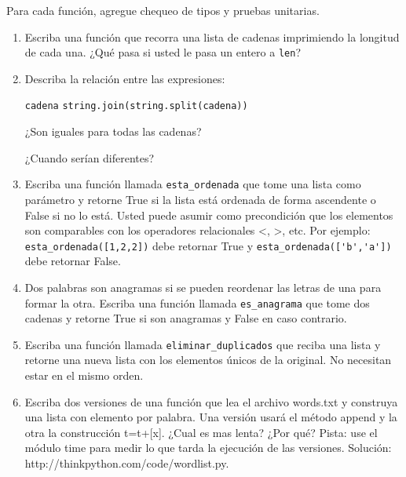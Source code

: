 Para cada función, agregue chequeo de tipos y pruebas unitarias.


\begin{enumerate}

 \item Escriba una función que  recorra una lista de cadenas 
   imprimiendo la longitud de cada una. ¿Qué pasa si usted
   le pasa un entero a  \texttt{len}?

 \item Describa la relación entre las expresiones: 
 
 \texttt{cadena} \hfill  {\tt string.join(string.split(cadena))}
 
 ¿Son iguales para todas las cadenas? 
 
 ¿Cuando serían diferentes?
  
  \item Escriba una función llamada \verb+esta_ordenada+ que tome una lista como parámetro y
  retorne True si la lista está ordenada de forma ascendente o False si no lo está.
  Usted puede asumir como precondición que los elementos son comparables con los 
  operadores relacionales <, >, etc. Por ejemplo: \verb+esta_ordenada([1,2,2])+ debe retornar
  True y \verb+esta_ordenada(['b','a'])+ debe retornar False.
  
  \item Dos palabras son anagramas si se pueden reordenar las letras de una para formar
  la otra. Escriba una función llamada \verb+es_anagrama+ que tome dos cadenas y retorne True
  si son anagramas y False en caso contrario.
  
  \item Escriba una función llamada \verb+eliminar_duplicados+ que reciba una lista y retorne 
  una nueva lista con los elementos únicos de la original. No necesitan estar en el mismo 
  orden.
  
  \item Escriba dos versiones de una función que lea el archivo words.txt y construya una lista con elemento por 
  palabra. Una versión usará el método append y la otra la construcción t=t+[x]. ¿Cual es mas lenta? ¿Por qué?
  Pista: use el módulo time para medir lo que tarda la ejecución de las versiones. 
  Solución: http://thinkpython.com/code/wordlist.py.

 
\end{enumerate}